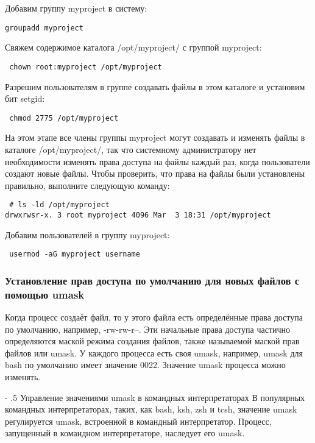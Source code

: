 \documentclass[a4paper,10pt,twoside]{article}
\makeatletter
\renewcommand\paragraph{%
   \@startsection{paragraph}{4}{0mm}%
      {-\baselineskip}%
      {.5\baselineskip}%
      {\normalfont\normalsize\bfseries}}
\makeatother
\begin{document}
Добавим группу myproject в систему:
\begin{verbatim}
groupadd myproject
\end{verbatim} 
Свяжем содержимое каталога /opt/myproject/ с группой myproject:
\begin{verbatim}
 chown root:myproject /opt/myproject
\end{verbatim} 

Разрешим пользователям в группе создавать файлы в этом каталоге и установим бит setgid:
\begin{verbatim}
 chmod 2775 /opt/myproject
\end{verbatim} 

На этом этапе все члены группы myproject могут создавать и изменять файлы в каталоге /opt/myproject/, так что системному администратору нет необходимости изменять права доступа на файлы каждый раз, когда пользователи создают новые файлы. Чтобы проверить, что права на файлы были установлены правильно, выполните следующую команду:

\begin{verbatim}
 # ls -ld /opt/myproject
drwxrwsr-x. 3 root myproject 4096 Mar  3 18:31 /opt/myproject
\end{verbatim} 

Добавим пользователей в группу myproject:
\begin{verbatim}
 usermod -aG myproject username
\end{verbatim} 

\subsubsection{Установление прав доступа по умолчанию для новых файлов с помощью umask}
Когда процесс создаёт файл, то у этого файла есть определённые права доступа по умолчанию, например, -rw-rw-r--. Эти начальные права доступа частично определяются маской режима создания файлов, также называемой маской прав файлов или umask. У каждого процесса есть своя umask, например, umask для bash по умолчанию имеет значение 0022. Значение umask процесса можно изменять.

\paragraph{Управление значениями umask в командных интерпретаторах}
В популярных командных интерпретаторах, таких, как bash, ksh, zsh и tcsh, значение umask регулируется umask, встроенной в командный интерпретатор. Процесс, запущенный в командном интерпретаторе, наследует его umask.
\end{document}
